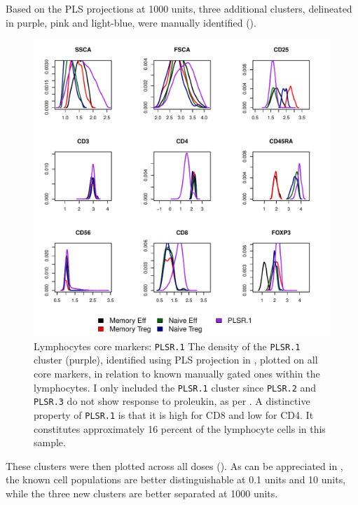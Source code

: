 Based on the \gls{PLS} projections at 1000 units, three additional clusters, delineated in purple, pink and light-blue, were manually identified
().
\begin{figure}[!h]
\centering
\includegraphics[scale=.7]{figures/plsr-lymphocytes-clusters}
{ Lymphocytes core markers: \texttt{PLSR.1} }
{
    The density of the \texttt{PLSR.1} cluster (purple), identified using \gls{PLS} projection in ,
    plotted  on all core markers, in relation to known manually gated ones within the lymphocytes.
    I only included the \texttt{PLSR.1} cluster since \texttt{PLSR.2} and \texttt{PLSR.3} do not show response to proleukin, as per .
    A distinctive property of \texttt{PLSR.1} is that it is high for CD8 and low for CD4.
    It constitutes approximately 16 percent of the lymphocyte cells in this sample.
}
\end{figure}
These clusters were then plotted across all doses ().
As can be appreciated in , the known cell populations are better distinguishable at 0.1 units and 10 units, while the three new clusters are better separated at 1000 units.
